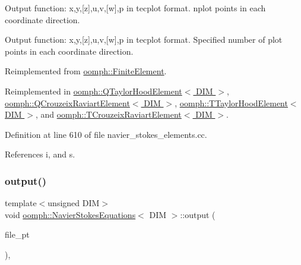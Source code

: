 Output function\+: x,y,\mbox{[}z\mbox{]},u,v,\mbox{[}w\mbox{]},p in tecplot format. nplot points in each coordinate direction. 

Output function\+: x,y,\mbox{[}z\mbox{]},u,v,\mbox{[}w\mbox{]},p in tecplot format. Specified number of plot points in each coordinate direction. 

Reimplemented from \hyperlink{classoomph_1_1FiniteElement_afa9d9b2670f999b43e6679c9dd28c457}{oomph\+::\+Finite\+Element}.



Reimplemented in \hyperlink{classoomph_1_1QTaylorHoodElement_a9a19616b9abaf15ad273f9eaa951de73}{oomph\+::\+Q\+Taylor\+Hood\+Element$<$ D\+I\+M $>$}, \hyperlink{classoomph_1_1QCrouzeixRaviartElement_a79751498caa7ce608e91b766fcb355cb}{oomph\+::\+Q\+Crouzeix\+Raviart\+Element$<$ D\+I\+M $>$}, \hyperlink{classoomph_1_1TTaylorHoodElement_a42a3843e4b3ee8e02c6f992b4c0284a8}{oomph\+::\+T\+Taylor\+Hood\+Element$<$ D\+I\+M $>$}, and \hyperlink{classoomph_1_1TCrouzeixRaviartElement_ad8228b4af3ec6e393b0d23d23bfaf1ea}{oomph\+::\+T\+Crouzeix\+Raviart\+Element$<$ D\+I\+M $>$}.



Definition at line 610 of file navier\+\_\+stokes\+\_\+elements.\+cc.



References i, and s.

\mbox{\label{classoomph_1_1NavierStokesEquations_acb921a406e5825d9b17ed41c40317e4a}} 
\subsubsection{\texorpdfstring{output()}{output()}\hspace{0.1cm}{\footnotesize\ttfamily [3/4]}}
{\footnotesize\ttfamily template$<$unsigned D\+IM$>$ \\
void \hyperlink{classoomph_1_1NavierStokesEquations}{oomph\+::\+Navier\+Stokes\+Equations}$<$ D\+IM $>$\+::output (\begin{DoxyParamCaption}\item[{F\+I\+LE $\ast$}]{file\+\_\+pt }\end{DoxyParamCaption})\hspace{0.3cm}{\ttfamily [inline]}, {\ttfamily [virtual]}}



